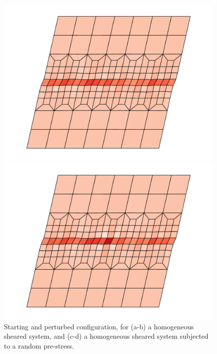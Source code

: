 \documentclass[fleqn]{goose-article}
\begin{document}
\begin{figure}[htp]
\begin{minipage}[t]{.40\textwidth}
    \end{minipage}
    \\
    \begin{minipage}[t]{.40\textwidth}
        \centering
        \includegraphics[width=\textwidth]{prestress_1_config.pdf}
    \end{minipage}
    \hspace{0.01\textwidth}
    \begin{minipage}[t]{.40\textwidth}
        \centering
        \includegraphics[width=\textwidth]{prestress_1_config-perturbed.pdf}
    \end{minipage}
    \caption{
        Starting and perturbed configuration, for (a-b) a homogeneous sheared system, and
        (c-d) a homogeneous sheared system subjected to a random pre-stress.
    }
    \label{fig:example:config}
\end{figure}
\end{document}
